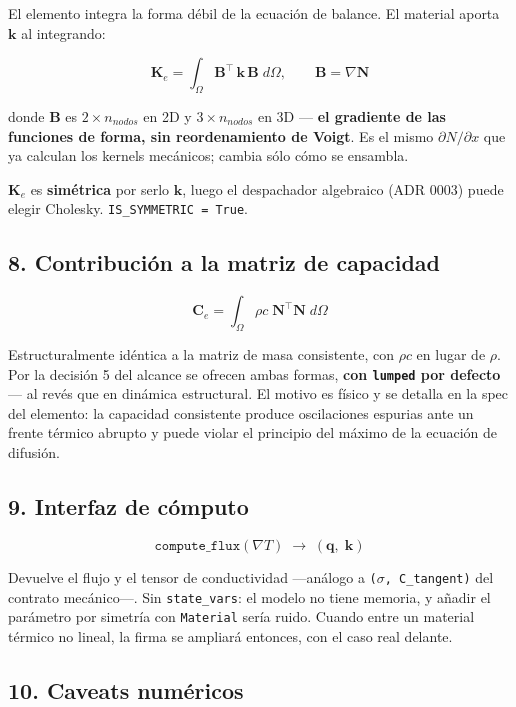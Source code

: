 \documentclass[11pt,letterpaper,oneside]{report}
\begin{document}
El elemento integra la forma débil de la ecuación de balance. El material aporta $\mathbf k$ al integrando:

\[
\mathbf K_e = \int_\Omega \mathbf B^\top\,\mathbf k\,\mathbf B\;d\Omega, \qquad \mathbf B = \nabla\mathbf N
\]

donde $\mathbf B$ es $2\times n_{nodos}$ en 2D y $3\times n_{nodos}$ en 3D --- \textbf{el gradiente de las funciones de forma, sin reordenamiento de Voigt}. Es el mismo $\partial N/\partial x$ que ya calculan los kernels mecánicos; cambia sólo cómo se ensambla.

$\mathbf K_e$ es \textbf{simétrica} por serlo $\mathbf k$, luego el despachador algebraico (ADR 0003) puede elegir Cholesky. \texttt{IS\_SYMMETRIC = True}.

\subsection{8. Contribución a la matriz de capacidad}

\[
\mathbf C_e = \int_\Omega \rho c\;\mathbf N^\top\mathbf N\;d\Omega
\]

Estructuralmente idéntica a la matriz de masa consistente, con $\rho c$ en lugar de $\rho$. Por la decisión 5 del alcance se ofrecen ambas formas, \textbf{con \texttt{lumped} por defecto} --- al revés que en dinámica estructural. El motivo es físico y se detalla en la spec del elemento: la capacidad consistente produce oscilaciones espurias ante un frente térmico abrupto y puede violar el principio del máximo de la ecuación de difusión.

\subsection{9. Interfaz de cómputo}

\[
\texttt{compute\_flux}(\nabla T) \;\longrightarrow\; (\mathbf q,\; \mathbf k)
\]

Devuelve el flujo y el tensor de conductividad ---análogo a \texttt{(\ensuremath{\sigma}, C\_tangent)} del contrato mecánico---. Sin \texttt{state\_vars}: el modelo no tiene memoria, y añadir el parámetro por simetría con \texttt{Material} sería ruido. Cuando entre un material térmico no lineal, la firma se ampliará entonces, con el caso real delante.

\subsection{10. Caveats numéricos}
\end{document}
